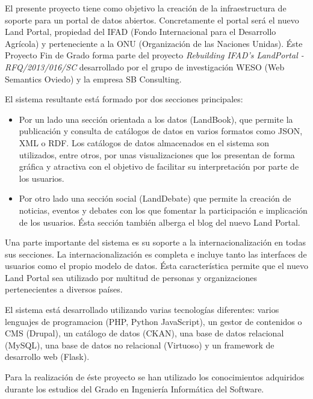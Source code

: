 El presente proyecto tiene como objetivo la creación de la infraestructura de
soporte  para un portal de datos abiertos.  Concretamente
el portal será el nuevo Land Portal, propiedad del IFAD (Fondo Internacional para
el Desarrollo Agrícola) y perteneciente a la ONU (Organización de las Naciones
Unidas).  Éste Proyecto Fin de Grado forma parte del proyecto \textit{Rebuilding
IFAD's LandPortal - RFQ/2013/016/SC} desarrollado por el grupo de investigación
WESO (Web Semantics Oviedo) y la empresa SB Consulting.

El sistema resultante está formado por dos secciones principales:
\begin{itemize}
	\item
		Por un lado una sección orientada a los datos (LandBook), que permite
		la publicación y consulta de catálogos de datos en varios formatos
		como JSON, XML o RDF.  Los catálogos de datos almacenados en el
		sistema son utilizados, entre otros, por unas visualizaciones que los
		presentan de forma gráfica y atractiva con el objetivo de facilitar su
		interpretación por parte de los usuarios.
	\item
		Por otro lado una sección social (LandDebate) que permite la creación de
		noticias, eventos y debates con los que fomentar la participación e
		implicación de los usuarios.  Ésta sección también alberga el blog
		del nuevo Land Portal.
	
\end{itemize}

Una parte importante del sistema es su soporte a la internacionalización en todas 
sus secciones.  La internacionalización es completa e incluye tanto las interfaces
de usuarios como el propio modelo de datos.  Ésta característica permite que el
nuevo Land Portal sea utilizado por multitud de personas y organizaciones
pertenecientes a diversos países.

El sistema está desarrollado utilizando varias tecnologías diferentes: varios lenguajes
de programacion (PHP, Python JavaScript), un gestor de contenidos o CMS (Drupal),
un catálogo de datos (CKAN), una base de datos relacional (MySQL), una base de
datos no relacional (Virtuoso) y un framework de desarrollo web (Flask).

Para la realización de éste proyecto se han utilizado los conocimientos adquiridos
durante los estudios del Grado en Ingeniería Informática del Software.